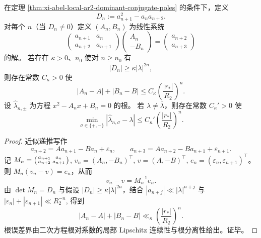 \begin{theorem}[四点局部回归对二阶参数的指数恢复]\label{thm:xi-abel-local-fourpoint-regression-exponential-recovery}
在定理 \ref{thm:xi-abel-local-ar2-dominant-conjugate-poles} 的条件下，定义
\[
D_n:=a_{n+1}^2-a_na_{n+2}.
\]
对每个 \(n\)（当 \(D_n\neq0\)）定义 \((A_n,B_n)\) 为线性系统
\[
\begin{pmatrix}
a_{n+1} & a_n\\
a_{n+2} & a_{n+1}
\end{pmatrix}
\begin{pmatrix}
A_n\\
-B_n
\end{pmatrix}
=
\begin{pmatrix}
a_{n+2}\\
a_{n+3}
\end{pmatrix}
\]
的解。
若存在 \(\kappa>0\)、\(n_0\) 使对 \(n\ge n_0\) 有
\[
|D_n|\ge \kappa |\lambda|^{2n},
\]
则存在常数 \(C_\kappa>0\) 使
\[
|A_n-A|+|B_n-B|
\le
C_\kappa\left(\frac{|r_\ast|}{R_2}\right)^n.
\]
设 \(\widehat\lambda_{n,\pm}\) 为方程 \(x^2-A_nx+B_n=0\) 的根。
若 \(\lambda\neq\overline\lambda\)，则存在常数 \(C_\kappa'>0\) 使
\[
\min_{\sigma\in\{+,-\}}|\widehat\lambda_{n,\sigma}-\lambda|
\le
C_\kappa'\left(\frac{|r_\ast|}{R_2}\right)^n.
\]
\end{theorem}
\begin{proof}
近似递推写作
\[
a_{n+2}=Aa_{n+1}-Ba_n+\varepsilon_n,\qquad
a_{n+3}=Aa_{n+2}-Ba_{n+1}+\varepsilon_{n+1}.
\]
记
\(
M_n=\begin{psmallmatrix}a_{n+1}&a_n\\a_{n+2}&a_{n+1}\end{psmallmatrix}
\),
\(
v_n=(A_n,-B_n)^\top
\),
\(
v=(A,-B)^\top
\),
\(
e_n=(\varepsilon_n,\varepsilon_{n+1})^\top
\)。
则 \(M_n(v_n-v)=e_n\)，从而
\[
v_n-v=M_n^{-1}e_n.
\]
由 \(\det M_n=D_n\) 与假设 \( |D_n|\ge \kappa |\lambda|^{2n}\)，结合
\(
|a_{n+j}|\ll |\lambda|^{n+j}
\)
与
\(
|\varepsilon_n|+|\varepsilon_{n+1}|\ll R_2^{-n}
\),
得到
\[
|A_n-A|+|B_n-B|
\ll_\kappa
\left(\frac{|r_\ast|}{R_2}\right)^n.
\]
根误差界由二次方程根对系数的局部 Lipschitz 连续性与根分离性给出。证毕。
\end{proof}

